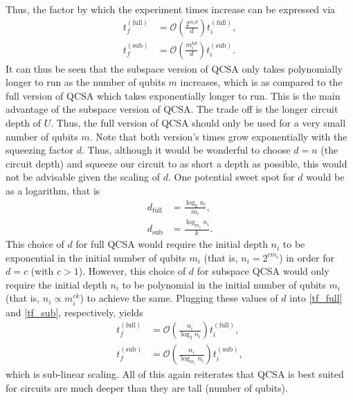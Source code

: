 \documentclass[Dual]{msu-thesis}
\begin{document}
Thus, the factor by which the experiment times increase can be expressed via
\begin{align}
\label{tf_full}
t^{(\text{full})}_f 
&= 
\mathcal{O}\left(\frac{2^{m_id}}{d}\right)
t^{(\text{full})}_i,
\\
\label{tf_sub}
t^{(\text{sub})}_f 
&= 
\mathcal{O}\left(\frac{m_i^{kd}}{d}\right)
t^{(\text{sub})}_i.
\end{align}
It can thus be seen that the subspace version of QCSA only takes polynomially longer to run as the number of qubits $m$ increases, which is as compared to the full version of QCSA which takes exponentially longer to run. This is the main advantage of the subspace version of QCSA. The trade off is the longer circuit depth of $U$. Thus, the full version of QCSA should only be used for a very small number of qubits $m$. Note that both version's times grow exponentially with the squeezing factor $d$. Thus, although it would be wonderful to choose $d=n$ (the circuit depth) and squeeze our circuit to as short a depth as possible, this would not be advisable given the scaling of $d$. One potential sweet spot for $d$ would be as a logarithm, that is 
\begin{align}
d_{\text{full}}&=\frac{\log_{2}{n_i}}{m_i},
\\
d_{\text{sub}}&=\frac{\log_{m_i}{n_i}}{k}.
\end{align}
This choice of $d$ for full QCSA would require the initial depth $n_i$ to be exponential in the initial number of qubits $m_i$ (that is, $n_i=2^{cm_i}$) in order for $d=c$ (with $c>1$). However, this choice of $d$ for subspace QCSA would only require the initial depth $n_i$ to be polynomial in the initial number of qubits $m_i$ (that is, $n_i\propto m_i^{ck}$) to achieve the same.
Plugging these values of $d$ into \ref{tf_full} and \ref{tf_sub}, respectively, yields
\begin{align}
\label{tf_full}
t^{(\text{full})}_f 
&= 
\mathcal{O}\left(\frac{n_i}{\log_{2}{n_i}}\right)
t^{(\text{full})}_i,
\\
\label{tf_sub}
t^{(\text{sub})}_f 
&= 
\mathcal{O}\left(\frac{n_i}{\log_{m_i}{n_i}}\right)
t^{(\text{sub})}_i,
\end{align}
which is sub-linear scaling. All of this again reiterates that QCSA is best suited for circuits are much deeper than they are tall (number of qubits). 
\end{document}
